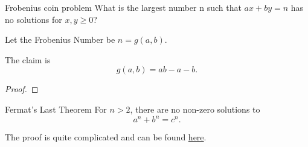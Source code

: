\begin{thrm}{Frobenius coin problem}{}
What is the largest number n such that $ax + by = n$ has no solutions for $x,y \ge 0$?

Let the Frobenius Number be $n=g(a,b)$.

The claim is 
\[ g(a, b) = ab - a - b.\]
\end{thrm}
\begin{proof}

\end{proof}

\begin{thrm}{Fermat's Last Theorem}{}
For $n>2$, there are no non-zero solutions to 
\[ a^n+b^n=c^n. \]
\end{thrm}

The proof is quite complicated and can be found \href{https://people.math.wisc.edu/~nboston/869.pdf}{here}.